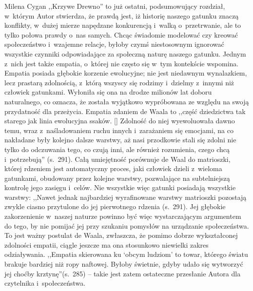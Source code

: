 \begin{recplenv}{Milena Cygan}
,,Krzywe Drewno'' to już ostatni, podsumowujący rozdział, w~którym Autor stwierdza, że prawdą jest, iż historię naszego
gatunku znaczą konflikty, w~dużej mierze napędzane konkurencją i~walką o~przetrwanie, ale to tylko połowa prawdy o~nas
samych. Chcąc świadomie modelować czy kreować społeczeństwo i~wzajemne relacje, byłoby czymś niestosownym ignorować
wszystkie czynniki odpowiadające za społeczną naturę naszego gatunku. Jednym z~nich jest także empatia, o~której nie
często się w~tym kontekście wspomina. Empatia posiada głębokie korzenie ewolucyjne; nie jest niedawnym wynalazkiem,
lecz prastarą zdolnością, z~którą wszyscy się rodzimy i~dzielmy z~innymi niż człowiek gatunkami. Wyłoniła się ona na
drodze milionów lat doboru naturalnego, co oznacza, że została wyjątkowo wypróbowana ze względu na swoją przydatność
dla przeżycia. Empatia zdaniem de Waala to ,,część dziedzictwa tak starego jak linia ewolucyjna ssaków. [\mydots] Zdolność do
niej wyewoluowała dawno temu, wraz z~naśladowaniem ruchu innych i~zarażaniem się emocjami, na co nakładane były kolejno
dalsze warstwy, aż nasi przodkowie stali się zdolni nie tylko do odczuwania tego, co czują inni, ale również
rozumienia, czego chcą i~potrzebują'' (s.~291). Całą umiejętność porównuje de Waal do matrioszki, której rdzeniem jest
automatyczny proces, jaki człowiek dzieli z~wieloma gatunkami, obudowany przez kolejne warstwy, pozwalające na
subtelniejszą kontrolę jego zasięgu i~celów. Nie wszystkie więc gatunki posiadają wszystkie warstwy: ,,Nawet jednak
najbardziej wyrafinowane warstwy matrioszki pozostają zwykle ciasno przytulone do jej pierwotnego rdzenia (s.~291). Jej
głębokie zakorzenienie w~naszej naturze powinno być więc wystarczającym argumentem do tego, by nie pomijać jej przy
szukaniu pomysłów na urządzanie społeczeństwa. To jest ważny postulat de Waala, zwłaszcza, że pomimo dobrze
wykształconej zdolności empatii, ciągle jeszcze ma ona stosunkowo niewielki zakres odziaływania. ,,Empatia skierowana ku
`obcym ludziom' to towar, którego światu brakuje bardziej niż ropy naftowej. Byłoby świetnie, gdyby udało się wytworzyć
jej choćby krztynę''(s.~285) -- takie jest zatem ostateczne przesłanie Autora dla czytelnika i~społeczeństwa.

\enlargethispage{-.5\baselineskip}


\end{recplenv}
